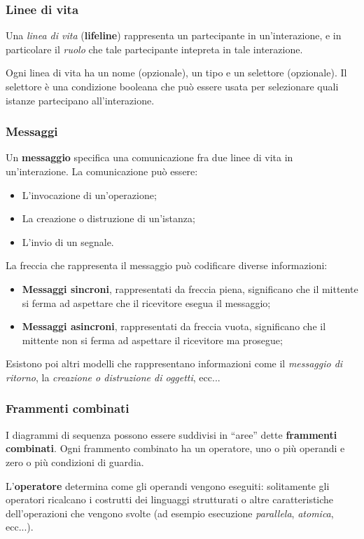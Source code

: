 \documentclass[a4paper,11pt]{article}
\begin{document}
\subsubsection{Linee di vita}
Una \textit{linea di vita} (\textbf{lifeline}) rappresenta un partecipante in un'interazione, e in particolare il \textit{ruolo} che tale partecipante intepreta in tale interazione.

Ogni linea di vita ha un nome (opzionale), un tipo e un selettore (opzionale). Il selettore è una condizione booleana che può essere usata per selezionare quali istanze partecipano all'interazione.

\subsubsection{Messaggi}
Un \textbf{messaggio} specifica una comunicazione fra due linee di vita in un'interazione.
La comunicazione può essere:
\begin{itemize}
	\item L'invocazione di un'operazione;
	\item La creazione o distruzione di un'istanza;
	\item L'invio di un segnale.
\end{itemize}

La freccia che rappresenta il messaggio può codificare diverse informazioni:
\begin{itemize}
	\item \textbf{Messaggi sincroni}, rappresentati da freccia piena, significano che il mittente si ferma ad aspettare che il ricevitore esegua il messaggio;
	\item \textbf{Messaggi asincroni}, rappresentati da freccia vuota, significano che il mittente non si ferma ad aspettare il ricevitore ma prosegue;
\end{itemize}

Esistono poi altri modelli che rappresentano informazioni come il \textit{messaggio di ritorno}, la \textit{creazione o distruzione di oggetti}, ecc...

\subsubsection{Frammenti combinati}
I diagrammi di sequenza possono essere suddivisi in “aree” dette \textbf{frammenti combinati}.
Ogni frammento combinato ha un operatore, uno o più operandi e zero o più condizioni di guardia.

L'\textbf{operatore} determina come gli operandi vengono eseguiti: solitamente gli operatori ricalcano i costrutti dei linguaggi strutturati o altre caratteristiche dell'operazioni che vengono svolte (ad esempio esecuzione \textit{parallela}, \textit{atomica}, ecc...).
\end{document}
